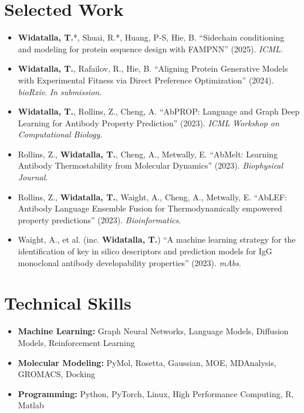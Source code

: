 \documentclass[11pt, a4paper]{article}
\begin{document}
\section{Selected Work}
\begin{itemize}[leftmargin=*,nosep,itemsep=2pt]
    \item \textbf{Widatalla, T.}*, Shuai, R.*, Huang, P-S, Hie, B. ``Sidechain conditioning and modeling for protein sequence design with FAMPNN'' (2025). \textit{ICML}.
    \item \textbf{Widatalla, T.}, Rafailov, R., Hie, B. ``Aligning Protein Generative Models with Experimental Fitness via Direct Preference Optimization'' (2024). \textit{bioRxiv}. \textit{In submission}.
    \item \textbf{Widatalla, T.}, Rollins, Z., Cheng, A. ``AbPROP: Language and Graph Deep Learning for Antibody Property Prediction'' (2023). \textit{ICML Workshop on Computational Biology}.
    \item Rollins, Z., \textbf{Widatalla, T.}, Cheng, A., Metwally, E. ``AbMelt: Learning Antibody Thermostability from Molecular Dynamics'' (2023). \textit{Biophysical Journal}.
    \item Rollins, Z., \textbf{Widatalla, T.}, Waight, A., Cheng, A., Metwally, E. ``AbLEF: Antibody Language Ensemble Fusion for Thermodynamically empowered property predictions'' (2023). \textit{Bioinformatics}.
    \item Waight, A., et al. (inc. \textbf{Widatalla, T.}) ``A machine learning strategy for the identification of key in silico descriptors and prediction models for IgG monoclonal antibody developability properties'' (2023). \textit{mAbs}.
\end{itemize}

\section{Technical Skills}
\begin{itemize}[leftmargin=*,nosep,itemsep=2pt]
    \item \textbf{Machine Learning:} Graph Neural Networks, Language Models, Diffusion Models, Reinforcement Learning
    \item \textbf{Molecular Modeling:} PyMol, Rosetta, Gaussian, MOE, MDAnalysis, GROMACS, Docking
    \item \textbf{Programming:} Python, PyTorch, Linux, High Performance Computing, R, Matlab
\end{itemize}
\end{document}
